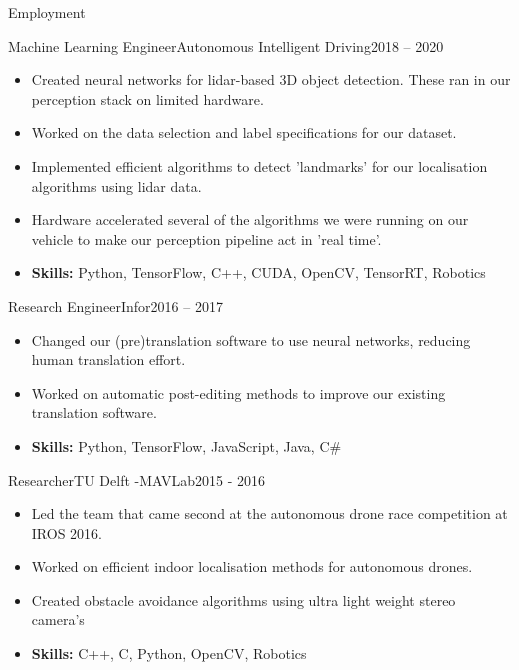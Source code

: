 \documentclass[]{mcdowellcv}
\begin{document}
\begin{cvsection}{Employment}
		\begin{cvsubsection}{Machine Learning Engineer}{Autonomous Intelligent Driving}{2018 -- 2020}	
			\begin{itemize}
				\item Created neural networks for lidar-based 3D object detection.  These ran in our perception stack on limited hardware. 
				\item Worked on the data selection and label specifications for our dataset. 
				\item Implemented efficient algorithms to detect 'landmarks' for our localisation algorithms using lidar data.
				\item Hardware accelerated several of the algorithms we were running on our vehicle to make our perception pipeline act in 'real time'. 
 				\item \textbf{Skills:} Python,  TensorFlow,  C++, CUDA,  OpenCV,  TensorRT,  Robotics
			\end{itemize}
		\end{cvsubsection}
		
		\begin{cvsubsection}{Research Engineer}{Infor}{2016 -- 2017}		
			\begin{itemize}
				\item Changed our (pre)translation software to use neural networks, reducing human translation effort. 
				\item Worked on automatic post-editing methods to improve our existing translation software. 
 				\item \textbf{Skills:} Python,  TensorFlow,  JavaScript,  Java,  C\#
			\end{itemize}
		\end{cvsubsection}
		
		\begin{cvsubsection}{Researcher}{TU Delft -MAVLab}{2015 - 2016}
			\begin{itemize}
				\item Led the team that came second at the autonomous drone race competition at IROS 2016. 
				\item Worked on efficient indoor localisation methods for autonomous drones. 
				\item Created obstacle avoidance algorithms using ultra light weight stereo camera's
 				\item \textbf{Skills:} C++,  C,  Python,  OpenCV, Robotics
			\end{itemize}
		\end{cvsubsection}



\end{cvsection}
\end{document}
